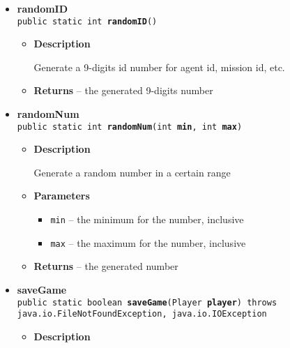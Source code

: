 {{{{{\begin{itemize}
{\begin{itemize}
{Process the user's input
}
\item{
{\bf  Parameters}
  \begin{itemize}
   \item{
\texttt{uinput} -- the user's input}
   \item{
\texttt{player} -- the player}
  \end{itemize}
}%
\end{itemize}
}%
\item{ 
{\bf  randomID}\\
\texttt{public static int\ {\bf  randomID}()
\label{personOfInterest.Game.randomID()}}%
\begin{itemize}
\item{
{\bf  Description}

Generate a 9-digits id number for agent id, mission id, etc.
}
\item{{\bf  Returns} -- 
the generated 9-digits number 
}%
\end{itemize}
}%
\item{ 
{\bf  randomNum}\\
\texttt{public static int\ {\bf  randomNum}(\texttt{int} {\bf  min},
\texttt{int} {\bf  max})
\label{personOfInterest.Game.randomNum(int, int)}}%
\begin{itemize}
\item{
{\bf  Description}

Generate a random number in a certain range
}
\item{
{\bf  Parameters}
  \begin{itemize}
   \item{
\texttt{min} -- the minimum for the number, inclusive}
   \item{
\texttt{max} -- the maximum for the number, inclusive}
  \end{itemize}
}%
\item{{\bf  Returns} -- 
the generated number 
}%
\end{itemize}
}%
\item{ 
{\bf  saveGame}\\
\texttt{public static boolean\ {\bf  saveGame}(\texttt{Player} {\bf  player}) throws java.io.FileNotFoundException, java.io.IOException
\label{personOfInterest.Game.saveGame(personOfInterest.Player)}}%
\begin{itemize}
\item{
{\bf  Description}

}
\end{itemize}}
\end{itemize}}}}}}
